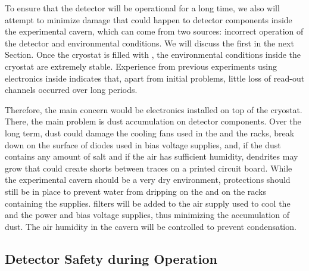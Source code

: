 To ensure that the  detector will be operational for a long
time, we also will attempt to minimize 
damage that could happen to detector components inside the 
experimental cavern, which can come from two sources: incorrect
operation of the detector and environmental conditions. We
will discuss the first in the next Section. Once the cryostat is filled with , the environmental
conditions inside the cryostat are extremely stable. Experience from 
previous experiments using electronics inside 
 indicates that, apart from initial problems, little loss of read-out channels occurred over long periods. 

Therefore, the main concern would be electronics 
installed on top of the cryostat. There, the main problem
is dust accumulation on detector components. Over the long
term, dust could damage the cooling fans used
in the  and the  racks, break down 
on the surface of diodes used in bias voltage supplies,
and, if the dust contains any amount of salt and if the air has sufficient humidity, dendrites may grow that could create 
shorts between traces on a printed circuit board. While the
experimental cavern should be a very dry environment,
protections should still be in place to prevent water from 
dripping on the  and on the racks containing the
 supplies.  filters will be added to the
air supply used to cool the  and the  power and bias voltage supplies, thus minimizing
the accumulation of dust. The air humidity in the cavern 
will be controlled to prevent condensation.

\subsection{Detector Safety during Operation}
\label{sec:fdsp-tpcelec-safety-detops}

